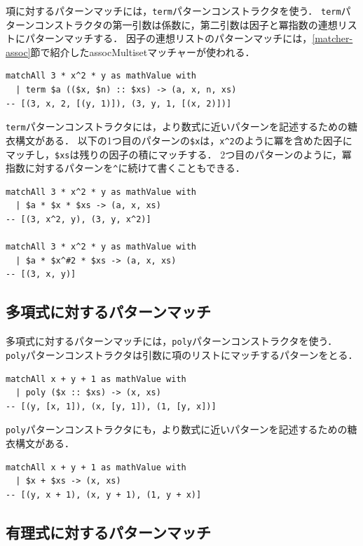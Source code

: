項に対するパターンマッチには，\lstinline{term}パターンコンストラクタを使う．
\lstinline{term}パターンコンストラクタの第一引数は係数に，第二引数は因子と冪指数の連想リストにパターンマッチする．
因子の連想リストのパターンマッチには，\ref{matcher-assoc}節で紹介したassocMultisetマッチャーが使われる．
\begin{lstlisting}[language=egison,numbers=none]
matchAll 3 * x^2 * y as mathValue with
  | term $a (($x, $n) :: $xs) -> (a, x, n, xs)
-- [(3, x, 2, [(y, 1)]), (3, y, 1, [(x, 2)])]
\end{lstlisting}

\lstinline{term}パターンコンストラクタには，より数式に近いパターンを記述するための糖衣構文がある．
以下の1つ目のパターンの\lstinline{$x}は，\lstinline{x^2}のように冪を含めた因子にマッチし，\lstinline{$xs}は残りの因子の積にマッチする．
2つ目のパターンのように，冪指数に対するパターンを\lstinline{^}に続けて書くこともできる．
\begin{lstlisting}[language=egison,numbers=none]
matchAll 3 * x^2 * y as mathValue with
  | $a * $x * $xs -> (a, x, xs)
-- [(3, x^2, y), (3, y, x^2)]

matchAll 3 * x^2 * y as mathValue with
  | $a * $x^#2 * $xs -> (a, x, xs)
-- [(3, x, y)]
\end{lstlisting}

\subsection{多項式に対するパターンマッチ}

多項式に対するパターンマッチには，\lstinline{poly}パターンコンストラクタを使う．
\lstinline{poly}パターンコンストラクタは引数に項のリストにマッチするパターンをとる．
\begin{lstlisting}[language=egison,numbers=none]
matchAll x + y + 1 as mathValue with
  | poly ($x :: $xs) -> (x, xs)
-- [(y, [x, 1]), (x, [y, 1]), (1, [y, x])]
\end{lstlisting}

\lstinline{poly}パターンコンストラクタにも，より数式に近いパターンを記述するための糖衣構文がある．
\begin{lstlisting}[language=egison,numbers=none]
matchAll x + y + 1 as mathValue with
  | $x + $xs -> (x, xs)
-- [(y, x + 1), (x, y + 1), (1, y + x)]
\end{lstlisting}

\subsection{有理式に対するパターンマッチ}

